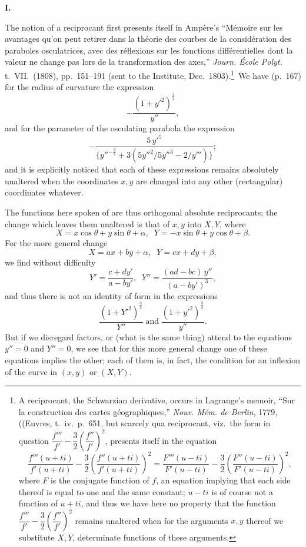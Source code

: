 \documentclass[11pt]{article}
\begin{document}
\medskip
\textbf{I.}

The notion of a reciprocant first presents itself in Amp\`ere's ``M\'emoire sur les avantages qu'on peut retirer dans la th\'eorie des courbes de la consid\'eration des paraboles osculatrices, avec des r\'eflexions sur les fonctions diff\'erentielles dont la valeur ne change pas lors de la transformation des axes,'' \textit{Journ. \'Ecole Polyt.} t.\ VII.\ (1808), pp.\ 151--191 (sent to the Institute, Dec.\ 1803).\footnote{A reciprocant, the Schwarzian derivative, occurs in Lagrange's memoir, ``Sur la construction des cartes g\'eographiques,'' \textit{Nouv. M\'em. de Berlin}, 1779, ((Euvres, t.\ iv.\ p.\ 651, but scarcely qua reciprocant, viz.\ the form in question $\dfrac{f'''}{f'} - \dfrac{3}{2}\left(\dfrac{f''}{f'}\right)^2$, presents itself in the equation
\[ \frac{f'''(u + ti)}{f'(u + ti)} - \frac{3}{2}\left(\frac{f''(u + ti)}{f'(u + ti)}\right)^2 = \frac{F'''(u - ti)}{F'(u - ti)} - \frac{3}{2}\left(\frac{F''(u - ti)}{F'(u - ti)}\right)^2, \]
where $F$ is the conjugate function of $f$, an equation implying that each side thereof is equal to one and the same constant; $u - ti$ is of course not a function of $u + ti$, and thus we have here no property that the function $\dfrac{f'''}{f'} - \dfrac{3}{2}\left(\dfrac{f''}{f'}\right)^2$ remains unaltered when for the arguments $x, y$ thereof we substitute $X, Y$, determinate functions of these arguments.}\ We have (p.\ 167) for the radius of curvature the expression
\[ -\frac{(1 + y'^2)^{\frac{3}{2}}}{y''}, \]
and for the parameter of the osculating parabola the expression
\[ -\frac{5\,y'^5}{\{y''^{-\frac{2}{3}} + 3(5y''^2 / 5y''^3 - 2/y''')\}}; \]
and it is explicitly noticed that each of these expressions remains absolutely unaltered when the coordinates $x, y$ are changed into any other (rectangular) coordinates whatever.

The functions here spoken of are thus orthogonal absolute reciprocants; the change which leaves them unaltered is that of $x, y$ into $X, Y$, where
\[ X = x\cos\theta + y\sin\theta + \alpha,\;\; Y = -x\sin\theta + y\cos\theta + \beta. \]
For the more general change
\[ X = ax + by + \alpha,\;\; Y = cx + dy + \beta, \]
we find without difficulty
\[ Y' = \frac{c + dy'}{a - by'},\;\; Y'' = \frac{(ad - bc)\,y''}{(a - by')^3}, \]
and thus there is not an identity of form in the expressions
\[ \frac{(1 + Y'^2)^{\frac{3}{2}}}{Y''}\;\text{and}\;\frac{(1 + y'^2)^{\frac{3}{2}}}{y''}. \]
But if we disregard factors, or (what is the same thing) attend to the equations $y'' = 0$ and $Y'' = 0$, we see that for this more general change one of these equations implies the other; each of them is, in fact, the condition for an inflexion of the curve in $(x, y)$ or $(X, Y)$.
\end{document}
